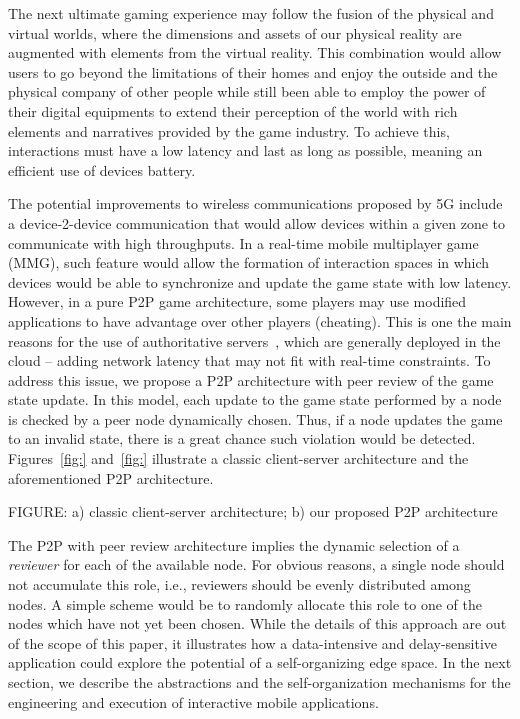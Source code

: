 The next ultimate gaming experience may follow the fusion of the physical and virtual worlds, where the dimensions and assets of our physical reality are augmented with elements from the virtual reality. This combination would allow users to go beyond the limitations of their homes and enjoy the outside and the physical company of other people while still been able to employ the power of their digital equipments to extend their perception of the world with rich elements and narratives provided by the game industry. To achieve this, interactions must have a low latency and last as long as possible, meaning an efficient use of devices battery.

The potential improvements to wireless communications proposed by 5G include a device-2-device communication that would allow devices within a given zone to communicate with high throughputs. In a real-time mobile multiplayer game (MMG), such feature would allow the formation of interaction spaces in which devices would be able to synchronize and update the game state with low latency. However, in a pure P2P game architecture, some players may use modified applications to have advantage over other players (cheating). This is one the main reasons for the use of authoritative servers~\cite{}, which are generally deployed in the cloud -- adding network latency that may not fit with real-time constraints. To address this issue, we propose a P2P architecture with peer review of the game state update. In this model, each update to the game state performed by a node is checked by a peer node dynamically chosen. Thus, if a node updates the game to an invalid state, there is a great chance such violation would be detected. Figures~\ref{fig:} and~\ref{fig:} illustrate a classic client-server architecture and the aforementioned P2P architecture.

FIGURE: a) classic client-server architecture; b) our proposed P2P architecture

The P2P with peer review architecture implies the dynamic selection of a \textit{reviewer} for each of the available node. For obvious reasons, a single node should not accumulate this role, i.e., reviewers should be evenly distributed among nodes. A simple scheme would be to randomly allocate this role to one of the nodes which have not yet been chosen. While the details of this approach are out of the scope of this paper, it illustrates how a data-intensive and delay-sensitive application could explore the potential of a self-organizing edge space. In the next section, we describe the abstractions and the self-organization mechanisms for the engineering and execution of interactive mobile applications.

